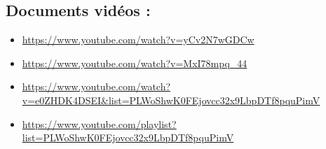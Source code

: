 \documentclass{article}
\begin{document}
\subsection{Documents vidéos :}
\begin{itemize}
    \item \url{https://www.youtube.com/watch?v=yCv2N7wGDCw}
    \item \url{https://www.youtube.com/watch?v=MxI78mpq_44}
    \item \url{https://www.youtube.com/watch?v=e0ZHDK4DSEI&list=PLWoShwK0FEjovcc32x9LbpDTf8pquPimV}
    \item \url{https://www.youtube.com/playlist?list=PLWoShwK0FEjovcc32x9LbpDTf8pquPimV} \\
\end{itemize}
\end{document}
